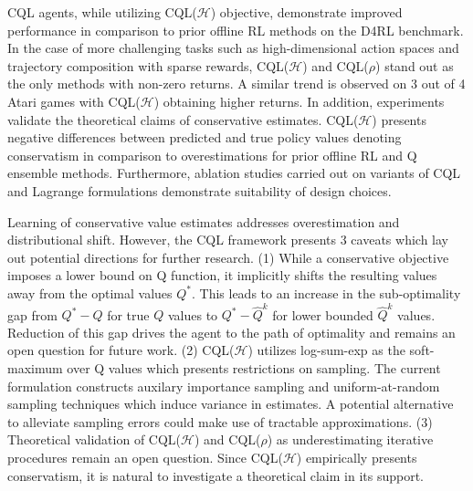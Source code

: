 \documentclass[11pt,letterpaper]{article}
\begin{document}
CQL agents, while utilizing CQL($\mathcal{H}$) objective, demonstrate improved performance in comparison to prior offline RL methods on the D4RL benchmark. In the case of more challenging tasks such as high-dimensional action spaces and trajectory composition with sparse rewards, CQL($\mathcal{H}$) and CQL($\rho$) stand out as the only methods with non-zero returns. A similar trend is observed on 3 out of 4 Atari games with CQL($\mathcal{H}$) obtaining higher returns. In addition, experiments validate the theoretical claims of conservative estimates. CQL($\mathcal{H}$) presents negative differences between predicted and true policy values denoting conservatism in comparison to overestimations for prior offline RL and Q ensemble methods. Furthermore, ablation studies carried out on variants of CQL and Lagrange formulations demonstrate suitability of design choices.

Learning of conservative value estimates addresses overestimation and distributional shift. However, the CQL framework presents 3 caveats which lay out potential directions for further research. (1) While a conservative objective imposes a lower bound on Q function, it implicitly shifts the resulting values away from the optimal values $Q^{*}$. This leads to an increase in the sub-optimality gap from $Q^{*} - Q$ for true $Q$ values to $Q^{*} - \hat{Q}^{k}$ for lower bounded $\hat{Q}^{k}$ values. Reduction of this gap drives the agent to the path of optimality and remains an open question for future work. (2) CQL($\mathcal{H}$) utilizes log-sum-exp as the soft-maximum over Q values which presents restrictions on sampling. The current formulation constructs auxilary importance sampling and uniform-at-random sampling techniques which induce variance in estimates. A potential alternative to alleviate sampling errors could make use of tractable approximations. (3) Theoretical validation of CQL($\mathcal{H}$) and CQL($\rho$) as underestimating iterative procedures remain an open question. Since CQL($\mathcal{H}$) empirically presents conservatism, it is natural to investigate a theoretical claim in its support.
\end{document}
